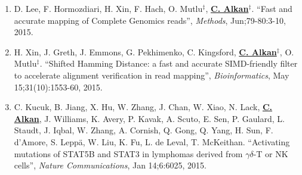 \begin{enumerate}[i)]
\begin{enumerate}
  \item        
  D. Lee, F. Hormozdiari, H. Xin, F. Hach, O. Mutlu$^\ddag$,  {\bf {\underline {C. Alkan}}}$^\ddag$.
  ``Fast and accurate mapping of Complete Genomics reads'',
  {\em Methods}, Jun;79-80:3-10, 2015. 

  \item        
 H. Xin, J. Greth, J. Emmons, G. Pekhimenko, C. Kingsford, {\bf {\underline{C. Alkan}}}$^\ddag$,  O. Mutlu$^\ddag$. 
 ``Shifted Hamming Distance: a fast and accurate SIMD-friendly filter to accelerate alignment verification in read mapping'',
{\em Bioinformatics},  May 15;31(10):1553-60, 2015.

  \item        
   C. Kucuk, B. Jiang, X. Hu, W. Zhang, J. Chan, W. Xiao, N. Lack,   {\bf {\underline {C. Alkan}}},  J. Williams, K. Avery, P. Kavak, A. Scuto, E. Sen,  P. Gaulard, L. Staudt, J. Iqbal,  W. Zhang,  A. Cornish, Q. Gong, Q.  Yang, H. Sun, F. d'Amore, S. Leppä, W. Liu, K. Fu, L. de Leval, T. McKeithan.
   ``Activating mutations of STAT5B and STAT3 in lymphomas derived from $\gamma\delta$-T or NK cells'',
 {\em Nature Communications}, Jan 14;6:6025, 2015.


\end{enumerate}


\end{enumerate}

